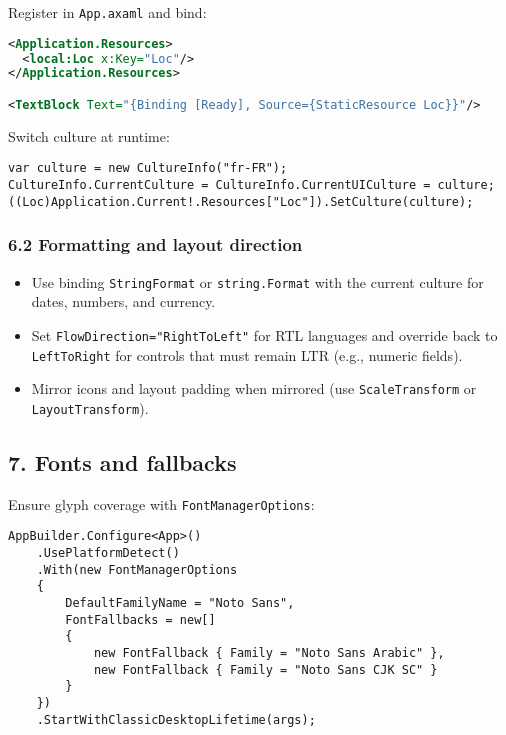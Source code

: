 Register in \passthrough{\lstinline!App.axaml!} and bind:

\begin{lstlisting}[language=XML]
<Application.Resources>
  <local:Loc x:Key="Loc"/>
</Application.Resources>

<TextBlock Text="{Binding [Ready], Source={StaticResource Loc}}"/>
\end{lstlisting}

Switch culture at runtime:

\begin{lstlisting}
var culture = new CultureInfo("fr-FR");
CultureInfo.CurrentCulture = CultureInfo.CurrentUICulture = culture;
((Loc)Application.Current!.Resources["Loc"]).SetCulture(culture);
\end{lstlisting}

\subsubsection{6.2 Formatting and layout
direction}\label{formatting-and-layout-direction}

\begin{itemize}
\tightlist
\item
  Use binding \passthrough{\lstinline!StringFormat!} or
  \passthrough{\lstinline!string.Format!} with the current culture for
  dates, numbers, and currency.
\item
  Set \passthrough{\lstinline!FlowDirection="RightToLeft"!} for RTL
  languages and override back to \passthrough{\lstinline!LeftToRight!}
  for controls that must remain LTR (e.g., numeric fields).
\item
  Mirror icons and layout padding when mirrored (use
  \passthrough{\lstinline!ScaleTransform!} or
  \passthrough{\lstinline!LayoutTransform!}).
\end{itemize}

\subsection{7. Fonts and fallbacks}\label{fonts-and-fallbacks}

Ensure glyph coverage with \passthrough{\lstinline!FontManagerOptions!}:

\begin{lstlisting}
AppBuilder.Configure<App>()
    .UsePlatformDetect()
    .With(new FontManagerOptions
    {
        DefaultFamilyName = "Noto Sans",
        FontFallbacks = new[]
        {
            new FontFallback { Family = "Noto Sans Arabic" },
            new FontFallback { Family = "Noto Sans CJK SC" }
        }
    })
    .StartWithClassicDesktopLifetime(args);
\end{lstlisting}


